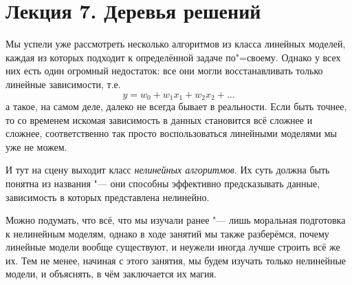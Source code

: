 \section* {Лекция 7. Деревья решений}

Мы успели уже рассмотреть несколько алгоритмов из класса линейных моделей, каждая из которых подходит к определённой задаче по"=своему. Однако у всех них есть один огромный недостаток: все они могли восстанавливать только линейные зависимости, т.е.
\[
y = w_0 + w_1 x_1 + w_2 x_2 + \dots
\]
а такое, на самом деле, далеко не всегда бывает в реальности. Если быть точнее, то со временем искомая зависимость в данных становится всё сложнее и сложнее, соответственно так просто воспользоваться линейными моделями мы уже не можем.

И тут на сцену выходит класс \textit{нелинейных алгоритмов}. Их суть должна быть понятна из названия "--- они способны эффективно предсказывать данные, зависимость в которых представлена нелинейно.

Можно подумать, что всё, что мы изучали ранее "--- лишь моральная подготовка к нелинейным моделям, однако в ходе занятий мы также разберёмся, почему линейные модели вообще существуют, и неужели иногда лучше строить всё же их. Тем не менее, начиная с этого занятия, мы будем изучать только нелинейные модели, и объяснять, в чём заключается их магия.